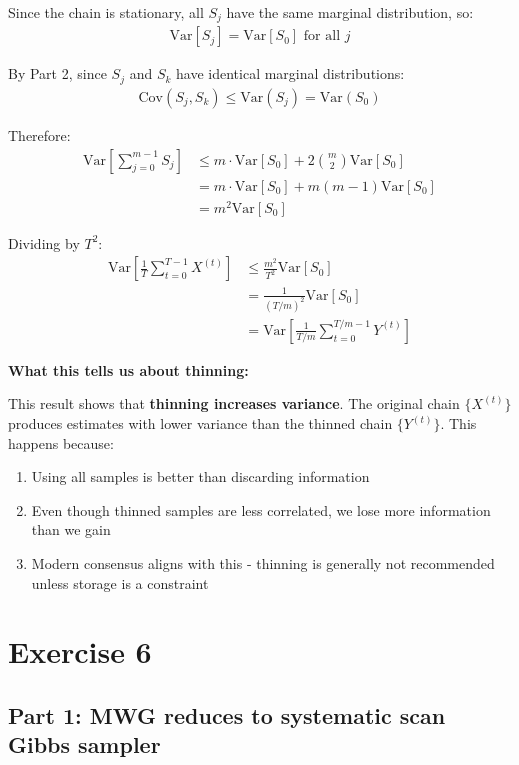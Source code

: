 \documentclass[11pt,a4paper]{article}
\begin{document}
Since the chain is stationary, all $S_j$ have the same marginal distribution, so:
\begin{align}
\text{Var}[S_j] = \text{Var}[S_0] \text{ for all } j
\end{align}

By Part 2, since $S_j$ and $S_k$ have identical marginal distributions:
\begin{align}
\text{Cov}(S_j, S_k) \leq \text{Var}(S_j) = \text{Var}(S_0)
\end{align}

Therefore:
\begin{align}
\text{Var}\left[\sum_{j=0}^{m-1} S_j\right] &\leq m \cdot \text{Var}[S_0] + 2\binom{m}{2} \text{Var}[S_0]\\
&= m \cdot \text{Var}[S_0] + m(m-1) \text{Var}[S_0]\\
&= m^2 \text{Var}[S_0]
\end{align}

Dividing by $T^2$:
\begin{align}
\text{Var}\left[\frac{1}{T}\sum_{t=0}^{T-1} X^{(t)}\right] &\leq \frac{m^2}{T^2} \text{Var}[S_0]\\
&= \frac{1}{(T/m)^2} \text{Var}[S_0]\\
&= \text{Var}\left[\frac{1}{T/m}\sum_{t=0}^{T/m-1} Y^{(t)}\right]
\end{align}

\textbf{What this tells us about thinning:}

This result shows that \textbf{thinning increases variance}. The original chain $\{X^{(t)}\}$ produces estimates with lower variance than the thinned chain $\{Y^{(t)}\}$. This happens because:

\begin{enumerate}
\item Using all samples is better than discarding information
\item Even though thinned samples are less correlated, we lose more information than we gain
\item Modern consensus aligns with this - thinning is generally not recommended unless storage is a constraint
\end{enumerate}

\section{Exercise 6}

\subsection{Part 1: MWG reduces to systematic scan Gibbs sampler}
\end{document}
